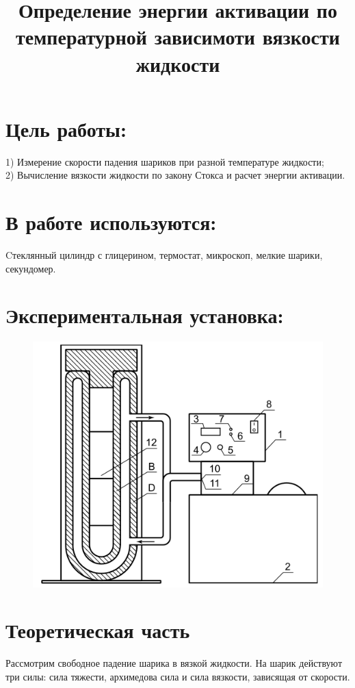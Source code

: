\documentclass[20pt]{article}
\author{}
\title{Определение энергии активации по температурной зависимоти вязкости жидкости}
\date{}
\begin{document}
\large
\maketitle
\section{Цель работы:}
1) Измерение скорости падения шариков при разной
температуре жидкости; \\
2) Вычисление вязкости жидкости по закону Стокса и
расчет энергии активации.
\section{В работе используются:}
Cтеклянный цилиндр с глицерином, термостат,
 микроскоп, мелкие шарики, секундомер.
\newpage



\section{Экспериментальная установка:}
\begin{figure}[h!]
\center
\includegraphics[scale=0.5]{asd.png}
\end{figure}
\section{Теоретическая часть}
Рассмотрим свободное падение шарика в вязкой жидкости. На
шарик действуют три силы: сила тяжести, архимедова сила и сила
вязкости, зависящая от скорости.
\end{document}
